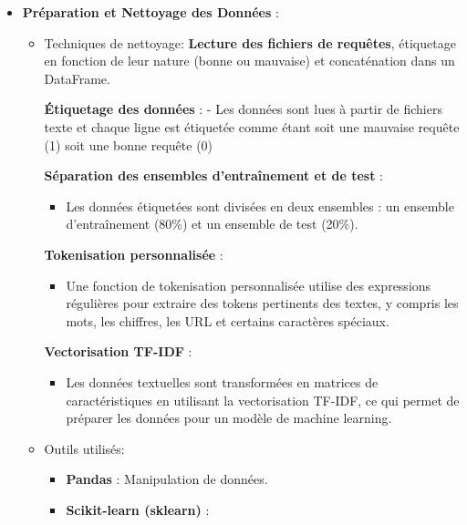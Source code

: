 \documentclass[
  letterpaper,
  DIV=11,
  numbers=noendperiod]{scrartcl}
\providecommand{\tightlist}{%
  \setlength{\itemsep}{0pt}\setlength{\parskip}{0pt}}\usepackage{longtable,booktabs,array}
\begin{document}
\begin{itemize}
\tightlist
\item
  \textbf{Préparation et Nettoyage des Données} :

  \begin{itemize}
  \item
    Techniques de nettoyage: \textbf{Lecture des fichiers de requêtes},
    étiquetage en fonction de leur nature (bonne ou mauvaise) et
    concaténation dans un DataFrame.

    \textbf{Étiquetage des données} : - Les données sont lues à partir
    de fichiers texte et chaque ligne est étiquetée comme étant soit une
    mauvaise requête (1) soit une bonne requête (0)

    \textbf{Séparation des ensembles d'entraînement et de test} :

    \begin{itemize}
    \tightlist
    \item
      Les données étiquetées sont divisées en deux ensembles : un
      ensemble d'entraînement (80\%) et un ensemble de test (20\%).
    \end{itemize}

    \textbf{Tokenisation personnalisée} :

    \begin{itemize}
    \tightlist
    \item
      Une fonction de tokenisation personnalisée utilise des expressions
      régulières pour extraire des tokens pertinents des textes, y
      compris les mots, les chiffres, les URL et certains caractères
      spéciaux.
    \end{itemize}

    \textbf{Vectorisation TF-IDF} :

    \begin{itemize}
    \tightlist
    \item
      Les données textuelles sont transformées en matrices de
      caractéristiques en utilisant la vectorisation TF-IDF, ce qui
      permet de préparer les données pour un modèle de machine learning.
    \end{itemize}
  \item
    Outils utilisés:

    \begin{itemize}
    \tightlist
    \item
      \textbf{Pandas} : Manipulation de données.
    \item
      \textbf{Scikit-learn (sklearn)} :


\end{itemize}
\end{itemize}
\end{itemize}
\end{document}
